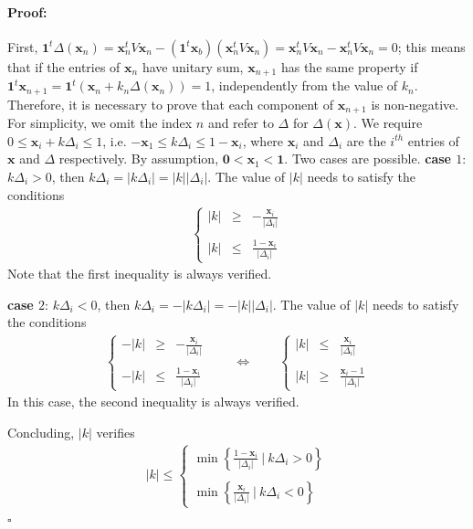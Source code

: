 \documentclass[preprint,11pt,authoryear]{elsarticle}
\newenvironment{proof}{\paragraph{Proof:}}{\hfill$\square$}
\begin{document}
\begin{proof}
First,
$ \mathbf 1^t \Delta(\mathbf{x}_n)=\mathbf{x}_n^tV\mathbf{x}_n-(\mathbf 1^t \mathbf{x}_b)(\mathbf{x}_n^tV\mathbf{x}_n)=\mathbf{x}_n^tV\mathbf{x}_n-\mathbf{x}_n^tV\mathbf{x}_n=0$; this means that if the entries of $\mathbf{x}_n$ have unitary sum, $\mathbf{x}_{n+1}$ has the same property if $\mathbf 1^t \mathbf{x}_{n+1}=\mathbf 1^t(\mathbf{x}_n+k_n \Delta(\mathbf{x}_n))=1$, 
independently from the value of $k_n$. Therefore, it is necessary to prove that each component of $\mathbf{x}_{n+1}$ is non-negative. For simplicity, we omit the index $n$ and refer to $\Delta$ for $\Delta(\mathbf{x})$. We require 
$ 0 \le \mathbf{x}_i +k \Delta_i \le 1$, i.e. $ -\mathbf{x}_1 \le k \Delta_i \le 1-\mathbf{x}_i$, 
where $\mathbf{x}_i$ and $\Delta_i$ are the $i^{th}$ entries of $\mathbf{x}$ and $\Delta$ respectively. By assumption, $\mathbf{0} < \mathbf{x}_1 < \mathbf{1}$.
Two cases are possible.
\smallskip\noindent
\textbf{case $1$}: $k \Delta_i >0$, then $k \Delta_i =|k \Delta_i |= |k|| \Delta_i |$. The value of $|k|$ needs to satisfy the conditions 
\begin{eqnarray*}
\left\{\begin{array}{rcl} |k|&\ge& -\frac{\mathbf{x}_i}{ |\Delta_i| } \\ \\
|k| & \le & \frac{1-\mathbf{x}_i}{ |\Delta_i| }
\end{array}
\right. 
\end{eqnarray*}
Note that the first inequality is always verified.

\smallskip\noindent
\textbf{case $2$}: $k \Delta_i <0$, then $k \Delta_i =-|k \Delta_i |= -|k|| \Delta_i |$. The value of $|k|$ needs to satisfy the conditions 
\begin{eqnarray*}
\left\{\begin{array}{rcl} -|k|&\ge& -\frac{\mathbf{x}_i}{ |\Delta_i| } \\ \\
-|k| & \le & \frac{1-\mathbf{x}_i}{ |\Delta_i| }
\end{array}
\right. \qquad \Leftrightarrow \qquad  \left\{\begin{array}{rcl} |k|&\le& \frac{\mathbf{x}_i}{ |\Delta_i| } \\ \\
|k| & \ge & \frac{\mathbf{x}_i-1 }{ |\Delta_i| }
\end{array}
\right. 
\end{eqnarray*}
In this case, the second inequality is always verified.


\smallskip\noindent
Concluding, $|k|$ verifies 
\begin{eqnarray*}
|k| \le \left\{\begin{array}{l} \min \left \{ \frac{1-\mathbf{x}_i}{ |\Delta_i| }  \ | \ k\Delta_i >0  \right  \} \\ \\
 \min \left \{ \frac{\mathbf{x}_i}{ |\Delta_i| }  \ | \ k\Delta_i <0  \right  \}
\end{array}
\right.
\end{eqnarray*}
\end{proof}
\end{document}
